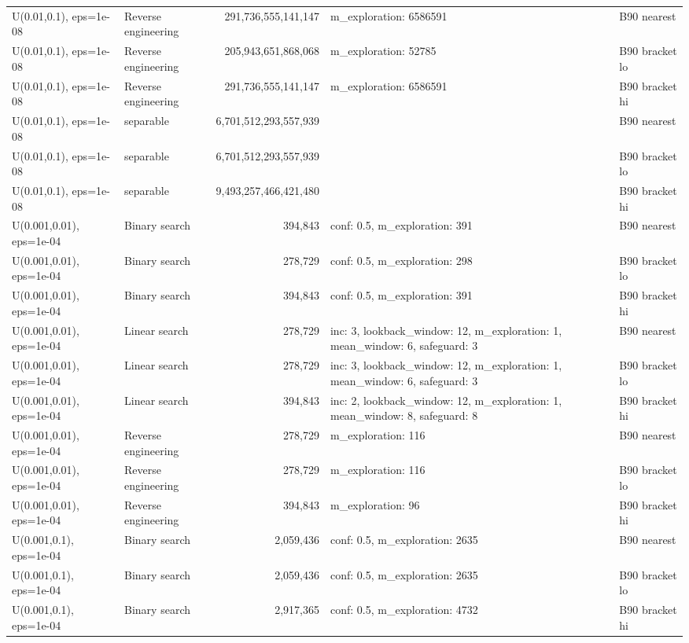 \begin{tabular}{llrll}
U(0.01,0.1), eps=1e-08 & Reverse engineering & 291,736,555,141,147 & m\_exploration: 6586591 & B90 nearest \\
U(0.01,0.1), eps=1e-08 & Reverse engineering & 205,943,651,868,068 & m\_exploration: 52785 & B90 bracket lo \\
U(0.01,0.1), eps=1e-08 & Reverse engineering & 291,736,555,141,147 & m\_exploration: 6586591 & B90 bracket hi \\
U(0.01,0.1), eps=1e-08 & separable & 6,701,512,293,557,939 &  & B90 nearest \\
U(0.01,0.1), eps=1e-08 & separable & 6,701,512,293,557,939 &  & B90 bracket lo \\
U(0.01,0.1), eps=1e-08 & separable & 9,493,257,466,421,480 &  & B90 bracket hi \\
U(0.001,0.01), eps=1e-04 & Binary search & 394,843 & conf: 0.5, m\_exploration: 391 & B90 nearest \\
U(0.001,0.01), eps=1e-04 & Binary search & 278,729 & conf: 0.5, m\_exploration: 298 & B90 bracket lo \\
U(0.001,0.01), eps=1e-04 & Binary search & 394,843 & conf: 0.5, m\_exploration: 391 & B90 bracket hi \\
U(0.001,0.01), eps=1e-04 & Linear search & 278,729 & inc: 3, lookback\_window: 12, m\_exploration: 1, mean\_window: 6, safeguard: 3 & B90 nearest \\
U(0.001,0.01), eps=1e-04 & Linear search & 278,729 & inc: 3, lookback\_window: 12, m\_exploration: 1, mean\_window: 6, safeguard: 3 & B90 bracket lo \\
U(0.001,0.01), eps=1e-04 & Linear search & 394,843 & inc: 2, lookback\_window: 12, m\_exploration: 1, mean\_window: 8, safeguard: 8 & B90 bracket hi \\
U(0.001,0.01), eps=1e-04 & Reverse engineering & 278,729 & m\_exploration: 116 & B90 nearest \\
U(0.001,0.01), eps=1e-04 & Reverse engineering & 278,729 & m\_exploration: 116 & B90 bracket lo \\
U(0.001,0.01), eps=1e-04 & Reverse engineering & 394,843 & m\_exploration: 96 & B90 bracket hi \\
U(0.001,0.1), eps=1e-04 & Binary search & 2,059,436 & conf: 0.5, m\_exploration: 2635 & B90 nearest \\
U(0.001,0.1), eps=1e-04 & Binary search & 2,059,436 & conf: 0.5, m\_exploration: 2635 & B90 bracket lo \\
U(0.001,0.1), eps=1e-04 & Binary search & 2,917,365 & conf: 0.5, m\_exploration: 4732 & B90 bracket hi \\

\end{tabular}
